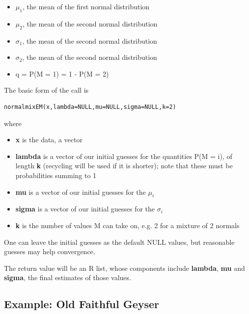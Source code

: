 \begin{itemize}

\item $\mu_1$, the mean of the first normal distribution 

\item $\mu_2$, the mean of the second normal distribution 

\item $\sigma_1$, the mean of the second normal distribution 

\item $\sigma_2$, the mean of the second normal distribution 

\item q = P(M = 1) = 1 - P(M = 2)

\end{itemize}

The basic form of the call is 

\begin{lstlisting}
normalmixEM(x,lambda=NULL,mu=NULL,sigma=NULL,k=2)
\end{lstlisting}

where

\begin{itemize}

\item {\bf x} is the data, a vector

\item {\bf lambda} is a vector of our initial guesses for the quantities
P(M = i), of length {\bf k} (recycling will be used if it is shorter);
note that these must be probabilities summing to 1

\item {\bf mu} is a vector of our initial guesses for the $\mu_i$

\item {\bf sigma} is a vector of our initial guesses for the $\sigma_i$

\item {\bf k} is the number of values M can take on, e.g. 2 for a
mixture of 2 normals

\end{itemize}

One can leave the initial guesses as the default NULL values, but
reasonable guesses may help convergence.

The return value will be an R list, whose components include {\bf
lambda}, {\bf mu} and {\bf sigma}, the final estimates of those values.

\subsection{Example:  Old Faithful Geyser}


